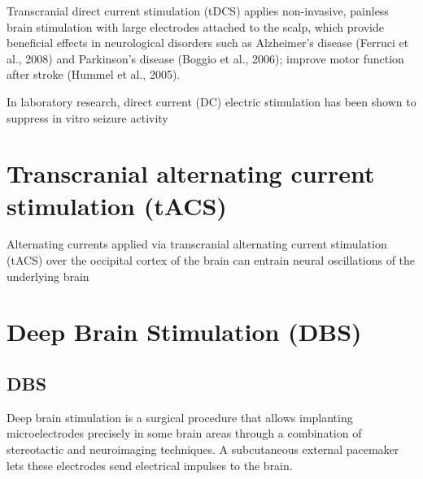 Transcranial direct current stimulation (tDCS) applies non-invasive, painless
brain stimulation with large electrodes attached to the scalp, which provide
beneficial effects in neurological disorders such as Alzheimer's disease
(Ferruci et al., 2008) and Parkinson's disease (Boggio et al., 2006); improve
motor function after stroke (Hummel et al., 2005).

% 


In laboratory research, direct current (DC) electric stimulation has been shown
to suppress in vitro seizure activity

\chapter{Transcranial alternating current stimulation (tACS)}

Alternating currents applied via transcranial alternating current stimulation
(tACS) over the occipital cortex of the brain can entrain neural oscillations of
the underlying brain  




\chapter{Deep Brain Stimulation (DBS)}
\label{chap:DBS}
\label{chap:Deep-Brain-Stimulation}


\section{DBS}
\label{sec:DBS}

Deep brain stimulation is a surgical procedure that allows implanting
microelectrodes precisely in some brain areas through a combination of
stereotactic and neuroimaging techniques. A subcutaneous external pacemaker lets
these electrodes send electrical impulses to the brain.   

